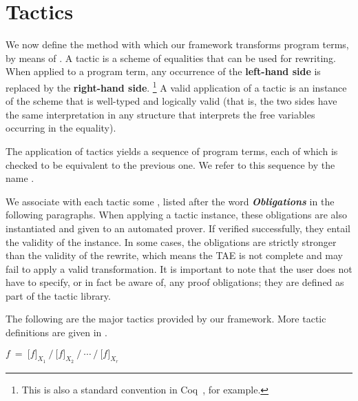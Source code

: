 \section{Tactics}
\label{tactics}

We now define the method with which our framework transforms program terms, by means of .
A tactic is a scheme of equalities that can be used for rewriting.
When applied to a program term, any occurrence of the {\bf left-hand side} is replaced by the {\bf right-hand side}.%
\footnote{This is also a standard convention in Coq~\cite{COQ}, for example.}
A valid application of a tactic is an instance of the scheme that is well-typed and logically valid
(that is, the two sides have the same interpretation in any structure that interprets the free
variables occurring in the equality).

The application of tactics yields a sequence of program terms, each of which is checked to
be equivalent to the previous one. We refer to this sequence by the name .

We associate with each tactic some , listed after the word \textbf{\textit{Obligations}}
in the following paragraphs.
When applying a tactic instance, these obligations are also instantiated and given to an automated prover. 
If verified successfully, they entail the validity of the instance.
In some cases, the obligations are strictly stronger than the validity of the rewrite,
which means the TAE is not complete and may fail to apply a valid transformation.
It is important to note that the user does not have to specify, or in fact be aware of,
any proof obligations; they are defined as part of the tactic library.

The following are the major tactics provided by our framework. 
More tactic definitions are given in .

\newcommand\Obligations{\medskip\noindent\textbf{\textit{Obligations}:} }
\newcommand\reduce{\operatorname{reduce}}
\newcommand\listConcat{{\scriptstyle \,++\,}}

\theoremstyle{definition}
\newtheorem{tactic}{Tactic}

\newcommand\tacticdef[1]{\subsection*{\sf\larger #1}}
\newcommand\tacticdefcompact[1]{\medskip\noindent{\sf\larger #1}\medskip\hfill}

\tacticdefcompact{Slice} \label{tactics:Slice}
$f ~=~ \big[f\big]_{X_1} ~\Big/~ \big[f\big]_{X_2} ~\Big/ ~\cdots~ \Big/~ \big[f\big]_{X_r}$\hspace{2mm}

